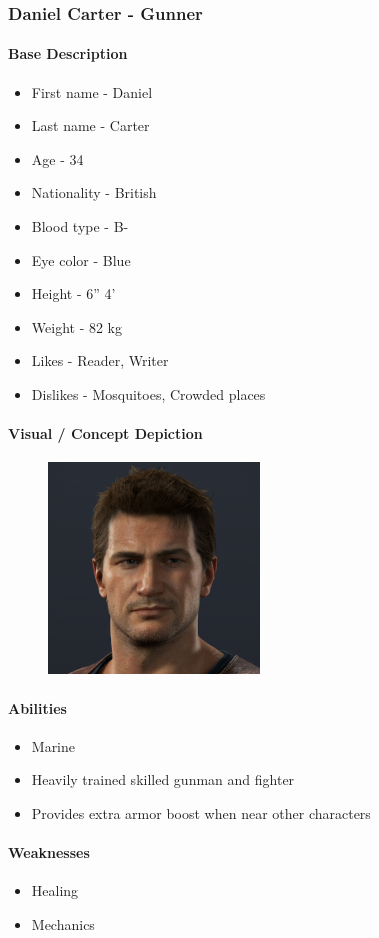 \subsubsection{Daniel Carter - Gunner}
	\paragraph{Base Description}\mbox{}
		\begin{itemize}
			\item First name - Daniel
			\item Last name - Carter
			\item Age - 34
			\item Nationality - British
			\item Blood type - B-
			\item Eye color - Blue
			\item Height - 6” 4’
			\item Weight - 82 kg
			\item Likes - Reader, Writer
			\item Dislikes - Mosquitoes, Crowded places
		\end{itemize}
	\paragraph{Visual / Concept Depiction}\mbox{}
		\begin{figure}[H]
			\centering
			\includegraphics[width=0.5\textwidth]{images/characters/carter}
		\end{figure}
	\paragraph{Abilities}\mbox{}
		\begin{itemize}
			\item Marine
			\item Heavily trained skilled gunman and fighter
			\item Provides extra armor boost when near other characters
		\end{itemize}
	\paragraph{Weaknesses}\mbox{}
		\begin{itemize}
			\item Healing
			\item Mechanics
		\end{itemize}